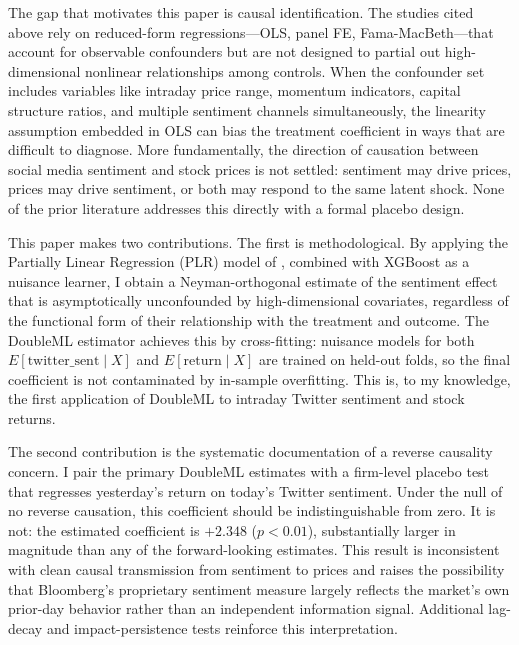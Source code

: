 The gap that motivates this paper is causal identification. The studies cited above rely on
reduced-form regressions---OLS, panel FE, Fama-MacBeth---that account for observable confounders
but are not designed to partial out high-dimensional nonlinear relationships among controls. When
the confounder set includes variables like intraday price range, momentum indicators, capital
structure ratios, and multiple sentiment channels simultaneously, the linearity assumption
embedded in OLS can bias the treatment coefficient in ways that are difficult to diagnose. More
fundamentally, the direction of causation between social media sentiment and stock prices is not
settled: sentiment may drive prices, prices may drive sentiment, or both may respond to the same
latent shock. None of the prior literature addresses this directly with a formal placebo design.

This paper makes two contributions. The first is methodological. By applying the Partially Linear
Regression (PLR) model of \citet{chernozhukov2018}, combined with XGBoost as a nuisance learner,
I obtain a Neyman-orthogonal estimate of the sentiment effect that is asymptotically unconfounded
by high-dimensional covariates, regardless of the functional form of their relationship with the
treatment and outcome. The DoubleML estimator achieves this by cross-fitting: nuisance models for
both $E[\text{twitter\_sent} \mid X]$ and $E[\text{return} \mid X]$ are trained on held-out folds,
so the final coefficient is not contaminated by in-sample overfitting. This is, to my knowledge,
the first application of DoubleML to intraday Twitter sentiment and stock returns.

The second contribution is the systematic documentation of a reverse causality concern. I pair the
primary DoubleML estimates with a firm-level placebo test that regresses yesterday's return on
today's Twitter sentiment. Under the null of no reverse causation, this coefficient should be
indistinguishable from zero. It is not: the estimated coefficient is $+2.348$ ($p < 0.01$),
substantially larger in magnitude than any of the forward-looking estimates. This result is
inconsistent with clean causal transmission from sentiment to prices and raises the possibility
that Bloomberg's proprietary sentiment measure largely reflects the market's own prior-day
behavior rather than an independent information signal. Additional lag-decay and impact-persistence
tests reinforce this interpretation.

